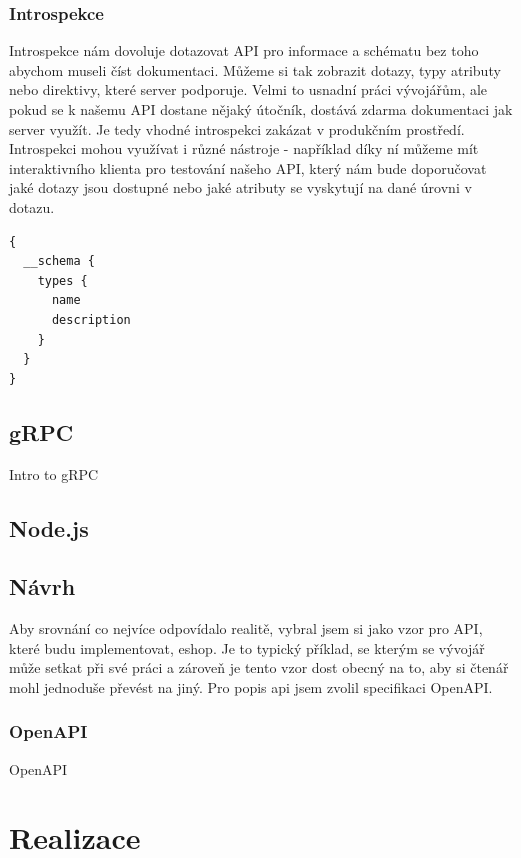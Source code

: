 \documentclass[thesis=M,czech]{FITthesis}[2019/12/23]
\begin{document}
\subsection{Introspekce}
Introspekce nám dovoluje dotazovat API pro informace a schématu bez toho abychom museli číst dokumentaci. Můžeme si tak zobrazit dotazy, typy atributy nebo direktivy, které server podporuje. Velmi to usnadní práci vývojářům, ale pokud se k našemu API dostane nějaký útočník, dostává zdarma dokumentaci jak server využít. Je tedy vhodné introspekci zakázat v produkčním prostředí.
Introspekci mohou využívat i různé nástroje - například díky ní můžeme mít interaktivního klienta pro testování našeho API, který nám bude doporučovat jaké dotazy jsou dostupné  nebo jaké atributy se vyskytují na dané úrovni v dotazu.

\begin{verbatim}
{
  __schema {
    types {
      name
      description
    }
  }
}
\end{verbatim}

\section{gRPC}
Intro to gRPC

\section{Node.js }
\section{Návrh}
Aby srovnání co nejvíce odpovídalo realitě, vybral jsem si jako vzor pro API, které budu implementovat, eshop. Je to typický příklad, se kterým se vývojář může setkat při své práci a zároveň je tento vzor dost obecný na to, aby si čtenář mohl jednoduše převést na jiný. Pro popis api jsem zvolil specifikaci OpenAPI.

\subsection{OpenAPI}
OpenAPI 

\chapter{}

\chapter{Realizace}
\end{document}

